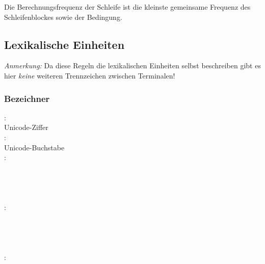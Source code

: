 Die Berechnungsfrequenz der Schleife ist die kleinste gemeinsame Frequenz des Schleifenblockes sowie der Bedingung.

\subsection{Lexikalische Einheiten}\label{Lexikalische Einheiten}

\emph{Anmerkung:} Da diese Regeln die lexikalischen Einheiten selbst beschreiben gibt es
hier \emph{keine} weiteren Trennzeichen zwischen Terminalen!


\subsubsection{Bezeichner}\label{Bezeichner}
:\label{Number}\\
\hspace*{1cm}Unicode-Ziffer\\
:\label{Letter}\\
\hspace*{1cm}Unicode-Buchstabe\\
:\label{Comp_XYZW}\\
\hspace*{1cm}\glq{}\grq \\
\hspace*{1cm}\glq{}\grq \\
\hspace*{1cm}\glq{}\grq \\
\hspace*{1cm}\glq{}\grq \\
:\label{Comp_RGBA}\\
\hspace*{1cm}\glq{}\grq \\
\hspace*{1cm}\glq{}\grq \\
\hspace*{1cm}\glq{}\grq \\
\hspace*{1cm}\glq{}\grq \\
:\label{SWIZZLE_XYZW}\\
\hspace*{1cm} \\
\hspace*{1cm}  \\
